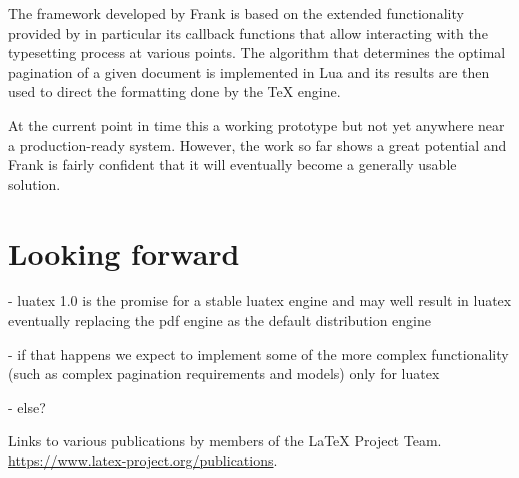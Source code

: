 \documentclass{ltnews}
\begin{document}
The framework developed by Frank is based on the extended
functionality provided by  in particular its callback
functions that allow interacting with the typesetting process at
various points. The algorithm that determines the optimal pagination
of a given document is implemented in {Lua} and its results are then
used to direct the formatting done by the \TeX{} engine.

At the current point in time this a working prototype but not yet
anywhere near a production-ready system. However, the work so far
shows a great potential and Frank is fairly confident that it will
eventually become a generally usable solution.

\section{Looking forward}

- luatex 1.0 is the promise for a stable luatex engine and may well
result in luatex eventually replacing the pdf engine as the default
distribution engine

- if that happens we expect to implement some of the more complex
functionality (such as complex pagination requirements and models)
only for luatex

- else?

  \begin{thebibliography}{10}

    \raggedright

    
Links to various publications by members of the \LaTeX{} Project Team.
\newblock \url{https://www.latex-project.org/publications}.

\end{thebibliography}
\end{document}

